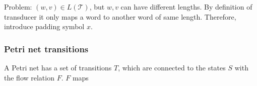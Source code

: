 Problem: $(w,v) \in L(\mathcal{T})$, but $w,v$ can have different lengths. By definition of transducer it only maps a word to another word of same length. Therefore, introduce padding symbol $x$. 



\subsubsection{Petri net transitions}
A Petri net has a set of transitions $T$, which are connected to the states $S$ with the flow relation $F$. $F$ maps





